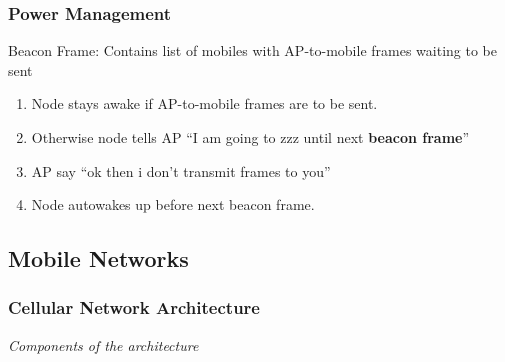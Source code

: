 \documentclass[a4paper]{article}
\begin{document}
\subsubsection{Power Management}
Beacon Frame: Contains list of mobiles with AP-to-mobile frames waiting to be sent
\begin{enumerate}
    \item Node stays awake if AP-to-mobile frames are to be sent.
    \item Otherwise node tells AP ``I am going to zzz until next \textbf{beacon frame}''
    \item AP say ``ok then i don't transmit frames to you''
    \item Node autowakes up before next beacon frame.
\end{enumerate}

\subsection{Mobile Networks}
\subsubsection{Cellular Network Architecture}
\textit{Components of the architecture}
\end{document}
